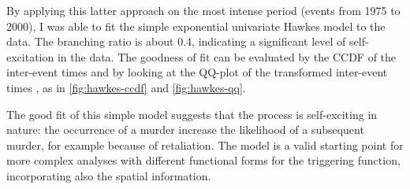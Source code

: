 By applying this latter approach on the most intense period (events from 1975 to 2000), I was able to fit the simple exponential univariate Hawkes model to the data. The branching ratio is about 0.4, indicating a significant level of self-excitation in the data. The goodness of fit can be evaluated by the CCDF of the inter-event times and by looking at the QQ-plot of the transformed inter-event times \cite{laubElementsHawkesProcesses2021}, as in \autoref{fig:hawkes-ccdf} and \autoref{fig:hawkes-qq}.



The good fit of this simple model suggests that the process is self-exciting in nature: the occurrence of a murder increase the likelihood of a subsequent murder, for example because of retaliation. The model is a valid starting point for more complex analyses with different functional forms for the triggering function, incorporating also the spatial information.

